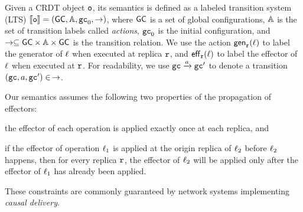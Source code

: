 
Given a CRDT object $\mathtt{o}$, its semantics is defined as a labeled transition
system (LTS) $\llbracket \mathtt{o} \rrbracket =
(\mathsf{GC},\mathbb{A},\mathtt{gc}_0,\rightarrow)$, where $\mathsf{GC}$ is a set of
global configurations, $\mathbb{A}$ is the set of transition labels called \emph{actions},
$\mathtt{gc}_0$ is the initial configuration, and
$\rightarrow\subseteq \mathsf{GC} \times \mathbb{A}\times \mathsf{GC}$ is the
transition relation.
We use the action $\mathsf{gen}_{\mathtt{r}}(\ell)$ to label the generator of $\ell$ when executed at replica $\mathtt{r}$,
and $\mathsf{eff}_{\mathtt{r}}(\ell)$ to label the effector of $\ell$ when executed at $\mathtt{r}$.
For readability, we use $\mathtt{gc} \xrightarrow{a} \mathtt{gc}'$
to denote a transition $(\mathtt{gc},a,\mathtt{gc}')\in\,\rightarrow$.


Our semantics assumes the following two
properties of the propagation of effectors:
\begin{inparaenum}[(i)]
\item the effector of each operation is applied exactly once at
  each replica, and
\item if the effector of operation $\ell_1$ is applied at the
  origin replica of $\ell_2$ before $\ell_2$ happens, then for every
  replica $\mathtt{r}$, the effector of $\ell_2$ will be applied only
  after the effector of $\ell_1$ has already been applied.
\end{inparaenum}
These constraints are commonly guaranteed by network systems
implementing \emph{causal delivery}.

